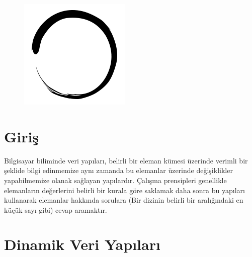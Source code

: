 \documentclass[12pt]{article}
\title{\vspace{-2em}\mytitle\vspace{-0.3em}}
\author{
	\textbf{Editor}\\
	Tahsin Enes Kuru  \\ \ \\ 
	\textbf{Reviewers} \\ 
	Baha Eren Yald{\i}z \\
    Burak Bu\u{g}rul
}
\date{}
\begin{document}
	
	\begin{figure}
		\centering
		\includegraphics[width=\linewidth/4]{inzva-logo.png}
		\label{fig:inzva}
	\end{figure}
	\maketitle
	
	\cleardoublepage
	\tableofcontents
	\cleardoublepage
	
	\section{Giri\c{s}}

    Bilgisayar biliminde veri yap{\i}lar{\i}, belirli bir eleman k\"{u}mesi \"{u}zerinde verimli bir \c{s}eklide bilgi edinmemize ayn{\i} zamanda bu elemanlar \"{u}zerinde de\u{g}i\c{s}iklikler yapabilmemize olanak sa\u{g}layan yap{\i}lard{\i}r. \c{C}al{\i}\c{s}ma prensipleri genellikle elemanlar{\i}n de\u{g}erlerini belirli bir kurala g\"{o}re saklamak daha sonra bu yap{\i}lar{\i} kullanarak elemanlar hakk{\i}nda sorulara (Bir dizinin belirli bir aral{\i}\u{g}{\i}ndaki en k\"{u}\c{c}\"{u}k say{\i} gibi) cevap aramakt{\i}r.
	\section{Dinamik Veri Yap{\i}lar{\i}}
	
\end{document}
